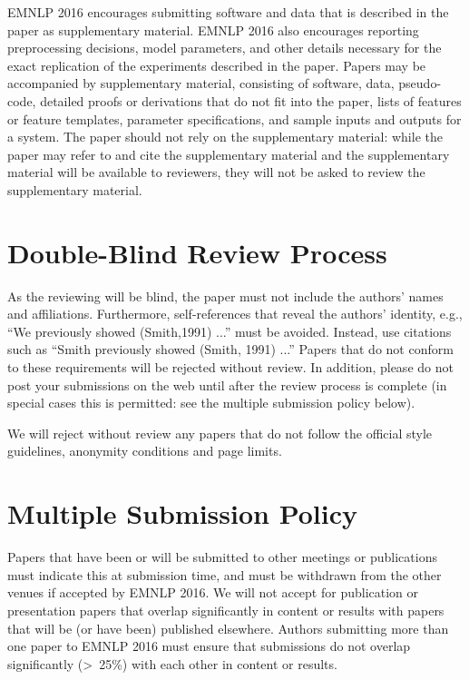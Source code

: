 \documentclass[11pt,letterpaper]{article}
\begin{document}
EMNLP 2016 encourages submitting software and data that is described in the
paper as supplementary material. EMNLP 2016 also encourages reporting
preprocessing decisions, model parameters, and other details necessary for the
exact replication of the experiments described in the paper. Papers may be
accompanied by supplementary material, consisting of software, data, pseudo-code,
detailed proofs or derivations that do not fit into the paper, lists of features
or feature templates, parameter specifications, and sample inputs and outputs
for a system. The paper should not rely on the supplementary material: while the
paper may refer to and cite the supplementary material and the supplementary
material will be available to reviewers, they will not be asked to review the
supplementary material.

\section{Double-Blind Review Process}
\label{sec-emnlp2016:blind}

As the reviewing will be blind, the paper must not include the authors' names and
affiliations.  Furthermore, self-references that reveal the authors' identity,
e.g., ``We previously showed (Smith,1991) ...'' must be avoided. Instead, use
citations such as ``Smith previously showed (Smith, 1991) ...'' Papers that do
not conform to these requirements will be rejected without review. In addition,
please do not post your submissions on the web until after the review process is
complete (in special cases this is permitted: see the multiple submission policy
below).

We will reject without review any papers that do not follow the official style
guidelines, anonymity conditions and page limits.

\section{Multiple Submission Policy}

Papers that have been or will be submitted to other meetings or publications must
indicate this at submission time, and must be withdrawn from the other venues if
accepted by EMNLP 2016. We will not accept for publication or presentation papers
that overlap significantly in content or results with papers that will be (or
have been) published elsewhere. Authors submitting more than one paper to EMNLP
2016 must ensure that submissions do not overlap significantly (\textgreater~25\%) with
each other in content or results.
\end{document}
